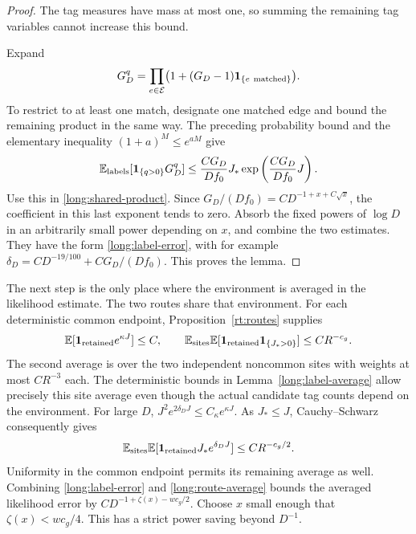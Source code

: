 \begin{proof}
The tag measures have mass at most one, so summing the remaining tag
variables cannot increase this bound.

Expand
\[
 G_D^q=\prod_{e\in\mathcal E}
             \bigl(1+(G_D-1)\mathbf 1_{\{e\ {\rm matched}\}}\bigr).
\]
To restrict to at least one match, designate one matched edge and bound
the remaining product in the same way.  The preceding probability bound
and the elementary inequality $(1+a)^M\le e^{aM}$ give
\begin{equation}\label{long:match-sum}
 \mathbb E_{\rm labels}[\mathbf 1_{\{q>0\}}G_D^q]
       \le \frac{C G_D}{Df_0}J_*
                         \exp\left(\frac{C G_D}{Df_0}J\right).
\end{equation}
Use this in \eqref{long:shared-product}.  Since
$G_D/(Df_0)=C D^{-1+x+C\sqrt x}$, the coefficient in this last
exponent tends to zero.  Absorb the fixed powers of $\log D$ in an
arbitrarily small power depending on $x$, and combine the two estimates.
They have the form \eqref{long:label-error}, with for example
$\delta_D=C D^{-19/100}+C G_D/(Df_0)$.  This proves the lemma.
\end{proof}

The next step is the only place where the environment is averaged in the
likelihood estimate.  The two routes share that environment.  For each
deterministic common endpoint, Proposition~\ref{rt:routes} supplies
\[
 \mathbb E[\mathbf 1_{\rm retained}e^{\kappa J}]\le C,
 \qquad
 \mathbb E_{\rm sites}\mathbb E[\mathbf 1_{\rm retained}\mathbf 1_{\{J_*>0\}}]
                                                \le CR^{-c_g}.
\]
The second average is over the two independent noncommon sites with
weights at most $CR^{-3}$ each.  The deterministic bounds in
Lemma~\ref{long:label-average} allow precisely this site average even
though the actual candidate tag counts depend on the environment.
For large $D$, $J^2e^{2\delta_DJ}\le C_\kappa e^{\kappa J}$.
As $J_*\le J$, Cauchy--Schwarz consequently gives
\begin{equation}\label{long:route-average}
 \mathbb E_{\rm sites}\mathbb E[
     \mathbf 1_{\rm retained}J_*e^{\delta_DJ}]
                      \le C R^{-c_g/2}.
\end{equation}
Uniformity in the common endpoint permits its remaining average as well.
Combining \eqref{long:label-error} and \eqref{long:route-average} bounds
the averaged likelihood error by
$C D^{-1+\zeta(x)-wc_g/2}$.  Choose $x$ small enough that
$\zeta(x)<wc_g/4$.  This has a strict power saving beyond $D^{-1}$.

